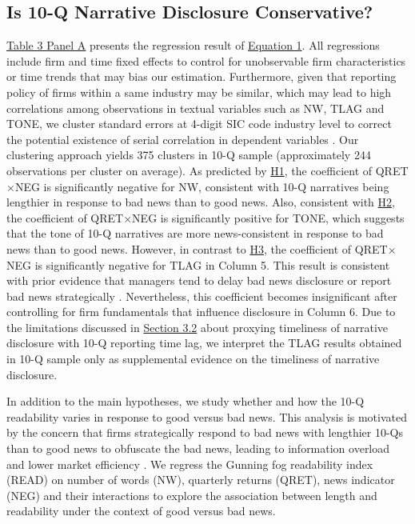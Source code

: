 \documentclass[letterpaper,11pt]{article}
\begin{document}
\begin{spacing}{1.5}
\subsection{Is 10-Q Narrative Disclosure Conservative?}
\hyperref[T3PA]{Table 3 Panel A} presents the regression result of \hyperref[eq1]{Equation 1}. All regressions include firm and time fixed effects to control for unobservable firm characteristics or time trends that may bias our estimation. Furthermore, given that reporting policy of firms within a same industry may be similar, which may lead to high correlations among observations in textual variables such as NW, TLAG and TONE, we cluster standard errors at 4-digit SIC code industry level to correct the potential existence of serial correlation in dependent variables . Our clustering approach yields 375 clusters in 10-Q sample (approximately 244 observations per cluster on average). As predicted by \hyperref[h1]{H1}, the coefficient of QRET$\times$NEG is significantly negative for NW, consistent with 10-Q narratives being lengthier in response to bad news than to good news. Also, consistent with \hyperref[h2]{H2}, the coefficient of QRET$\times$NEG is significantly positive for TONE, which suggests that the tone of 10-Q narratives are more news-consistent in response to bad news than to good news. However, in contrast to \hyperref[h3]{H3}, the coefficient of QRET$\times$NEG is significantly negative for TLAG in Column 5. This result is consistent with prior evidence that managers tend to delay bad news disclosure or report bad news strategically \cite{kothariManagersWithholdBad2009, niessnerStrategicDisclosureTiming2015, segalAreManagersStrategic2016}. Nevertheless, this coefficient becomes insignificant after controlling for firm fundamentals that influence disclosure in Column 6. Due to the limitations discussed in \hyperref[sec3.2]{Section 3.2} about proxying timeliness of narrative disclosure with 10-Q reporting time lag, we interpret the TLAG results obtained in 10-Q sample only as supplemental evidence on the timeliness of narrative disclosure.

In addition to the main hypotheses, we study whether and how the 10-Q readability varies in response to good versus bad news. This analysis is motivated by the concern that firms strategically respond to bad news with lengthier 10-Qs than to good news to obfuscate the bad news, leading to information overload and lower market efficiency \cite{chapmanInformationOverloadDisclosure2019}. We regress the Gunning fog readability index (READ) on number of words (NW), quarterly returns (QRET), news indicator (NEG) and their interactions to explore the association between length and readability under the context of good versus bad news.


\end{spacing}
\end{document}
